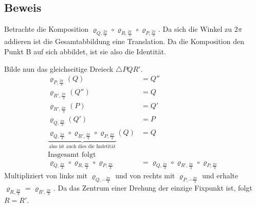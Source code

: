 \subsection{Beweis}
Betrachte die Komposition $\varrho_{Q, \frac{2 \pi}{3}} \circ \varrho_{R, \frac{2 \pi}{3}} \circ \varrho_{P, \frac{2 \pi}{3}}$.
Da sich die Winkel zu $2 \pi$ addieren ist die Gesamtabbildung eine Translation.
Da die Komposition den Punkt B auf sich abbildet, ist sie also die Identität.

Bilde nun das gleichseitige Dreieck $\triangle PQR'$.
\begin{align*}
	\varrho_{P, \frac{2 \pi}{3}} (Q) &= Q''   \\
	\varrho_{R', \frac{2 \pi}{3}} (Q'') &= Q  \\
	\varrho_{R', \frac{2 \pi}{3}} (P) &= Q'   \\
	\varrho_{Q, \frac{2 \pi}{3}} (Q') &= P    \\
	\underbrace{\varrho_{Q, \frac{2 \pi}{3}} \circ \varrho_{R', \frac{2 \pi}{3}} \circ \varrho_{P, \frac{2 \pi}{3}}}
	 _{\text{also ist auch dies die Indetit\"at}}
	 (Q) &= Q \\
	\text{Insgesamt folgt} & \\
	\varrho_{Q, \frac{2 \pi}{3}} \circ \varrho_{R, \frac{2 \pi}{3}} \circ \varrho_{P, \frac{2 \pi}{3}}
	&= \varrho_{Q, \frac{2 \pi}{3}} \circ \varrho_{R', \frac{2 \pi}{3}} \circ \varrho_{P, \frac{2 \pi}{3}}
\end{align*}
Multipliziert von links mit $\varrho_{Q, -\frac{2 \pi}{3}}$ und von rechts mit $\varrho_{P, -\frac{2 \pi}{3}}$ und erhalte $\varrho_{R, \frac{2 \pi}{3}} = \varrho_{R', \frac{2 \pi}{3}}$.
Da das Zentrum einer Drehung der einzige Fixpunkt ist, folgt $R = R'$. %
